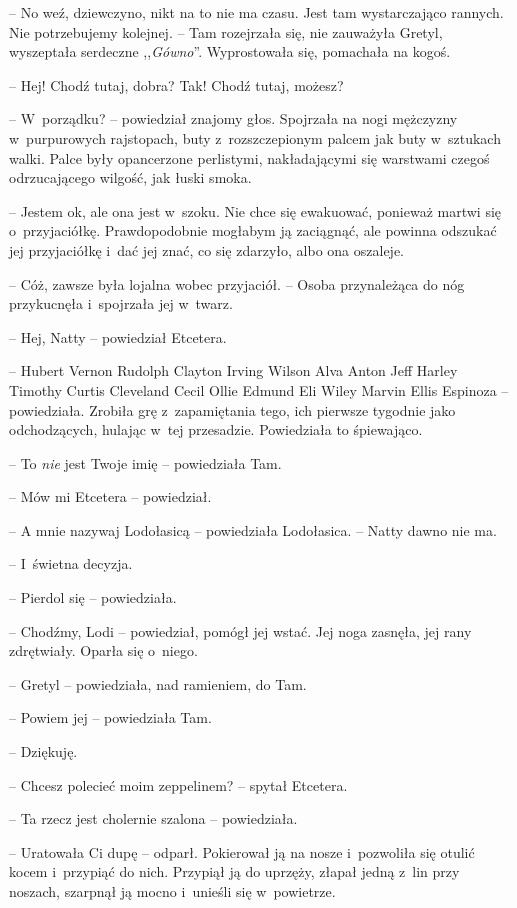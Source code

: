\documentclass[oneside,polish,11pt,sfheadings]{mwbk}
\begin{document}
-- No weź, dziewczyno, nikt na to nie ma czasu. Jest tam wystarczająco
rannych. Nie potrzebujemy kolejnej. -- Tam rozejrzała się, nie zauważyła
Gretyl, wyszeptała serdeczne ,,\textit{Gówno}''. Wyprostowała się,
pomachała na kogoś. 

-- Hej! Chodź tutaj, dobra? Tak! Chodź tutaj, możesz?

-- W~porządku? -- powiedział znajomy głos. Spojrzała na nogi mężczyzny w~purpurowych rajstopach, buty z~rozszczepionym palcem jak buty w~sztukach
walki. Palce były opancerzone perlistymi, nakładającymi się warstwami
czegoś odrzucającego wilgość, jak łuski smoka.

-- Jestem ok, ale ona jest w~szoku. Nie chce się ewakuować, ponieważ
martwi się o~przyjaciółkę. Prawdopodobnie mogłabym ją zaciągnąć, ale
powinna odszukać jej przyjaciółkę i~dać jej znać, co się zdarzyło, albo
ona oszaleje.

-- Cóż, zawsze była lojalna wobec przyjaciół. -- Osoba przynależąca do nóg
przykucnęła i~spojrzała jej w~twarz.

-- Hej, Natty -- powiedział Etcetera.

-- Hubert Vernon Rudolph Clayton Irving Wilson Alva Anton Jeff Harley
Timothy Curtis Cleveland Cecil Ollie Edmund Eli Wiley Marvin Ellis
Espinoza -- powiedziała. Zrobiła grę z~zapamiętania tego, ich pierwsze
tygodnie jako odchodzących, hulając w~tej przesadzie. Powiedziała to
śpiewająco.

-- To \textit{nie} jest Twoje imię -- powiedziała Tam.

-- Mów mi Etcetera -- powiedział.

-- A mnie nazywaj Lodołasicą -- powiedziała Lodołasica. -- Natty dawno nie
ma.

-- I~świetna decyzja.

-- Pierdol się -- powiedziała.

-- Chodźmy, Lodi -- powiedział, pomógł jej wstać. Jej noga zasnęła, jej
rany zdrętwiały. Oparła się o~niego.

-- Gretyl -- powiedziała, nad ramieniem, do Tam.

-- Powiem jej -- powiedziała Tam.

-- Dziękuję.

-- Chcesz polecieć moim zeppelinem? -- spytał Etcetera.

-- Ta rzecz jest cholernie szalona -- powiedziała.

-- Uratowała Ci dupę -- odparł. Pokierował ją na nosze i~pozwoliła się
otulić kocem i~przypiąć do nich. Przypiął ją do uprzęży, złapał jedną z~lin przy noszach, szarpnął ją mocno i~unieśli się w~powietrze.
\end{document}
